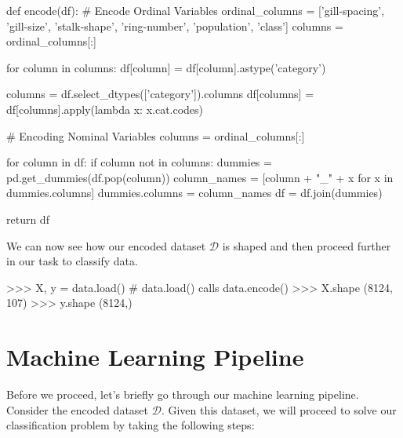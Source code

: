 \documentclass[fleqn]{article}
\begin{document}
    \begin{python}
def encode(df):
    # Encode Ordinal Variables
    ordinal_columns = ['gill-spacing', 'gill-size',
            'stalk-shape', 'ring-number', 'population', 'class']
    columns = ordinal_columns[:]

    for column in columns:
        df[column] = df[column].astype('category')

        columns = df.select_dtypes(['category']).columns
        df[columns] = df[columns].apply(lambda x: x.cat.codes)

    # Encoding Nominal Variables
    columns = ordinal_columns[:]

    for column in df:
        if column not in columns:
            dummies = pd.get_dummies(df.pop(column))
            column_names = [column + "_" + x for x in dummies.columns]
            dummies.columns = column_names
            df = df.join(dummies)

    return df
    \end{python}

    \noindent
    We can now see how our encoded dataset $ \mathcal{D} $ is shaped and then proceed
    further in our task to classify data.

    \begin{python}
>>> X, y = data.load() # data.load() calls data.encode()
>>> X.shape
(8124, 107)
>>> y.shape
(8124,)
    \end{python}

    \section{Machine Learning Pipeline}
    Before we proceed, let's briefly go through our machine learning pipeline. Consider
    the encoded dataset $ \mathcal{D} $. Given this dataset, we will proceed to solve our
    classification problem by taking the following steps:
\end{document}
